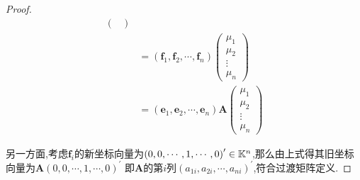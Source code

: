 {\begin{proof}
\begin{align*}
\begin{pmatrix}
                                                                         \end{pmatrix} \\
                        & =\left(\bm{f}_1,\bm{f}_2,\cdots,\bm{f}_n\right)
            \begin{pmatrix}
                \mu_1 \\\mu_2\\\vdots\\\mu_n
            \end{pmatrix}                                                                          \\
                        & =\left(\bm{e}_1,\bm{e}_2,\cdots,\bm{e}_n\right)\bm{A}
            \begin{pmatrix}
                \mu_1 \\\mu_2\\\vdots\\\mu_n
            \end{pmatrix}
        \end{align*}

        另一方面,考虑$\bm{f}_i$的新坐标向量为$\left(0,0,\cdots,1,\cdots,0\right)^{\prime}\in \mathbb{K} ^n$,那么由上式得其旧坐标向量为$\bm{A}\left(0,0,\cdots,1,\cdots,0
            \right)^{\prime}
        $
        即$\bm{A}$的第$i$列$\left(
            a_{1i},a_{2i},\cdots,a_{ni}
            \right)^{\prime}$,符合过渡矩阵定义.
    \end{proof}
}

